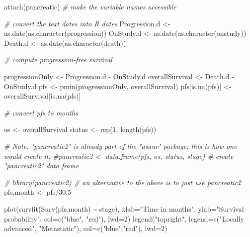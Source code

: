 \documentclass[
]{book}
\newenvironment{Shaded}{\begin{snugshade}}{\end{snugshade}}
\newcommand{\AttributeTok}[1]{\textcolor[rgb]{0.77,0.63,0.00}{#1}}
\newcommand{\CommentTok}[1]{\textcolor[rgb]{0.56,0.35,0.01}{\textit{#1}}}
\newcommand{\DecValTok}[1]{\textcolor[rgb]{0.00,0.00,0.81}{#1}}
\newcommand{\FloatTok}[1]{\textcolor[rgb]{0.00,0.00,0.81}{#1}}
\newcommand{\FunctionTok}[1]{\textcolor[rgb]{0.00,0.00,0.00}{#1}}
\newcommand{\NormalTok}[1]{#1}
\newcommand{\OtherTok}[1]{\textcolor[rgb]{0.56,0.35,0.01}{#1}}
\newcommand{\SpecialCharTok}[1]{\textcolor[rgb]{0.00,0.00,0.00}{#1}}
\newcommand{\StringTok}[1]{\textcolor[rgb]{0.31,0.60,0.02}{#1}}
\theoremstyle{definition}
\theoremstyle{definition}
\theoremstyle{definition}
\theoremstyle{definition}
\theoremstyle{remark}
\begin{document}
\begin{Shaded}
\begin{Highlighting}[]
\FunctionTok{attach}\NormalTok{(pancreatic)     }\CommentTok{\# make the variable names accessible}

\CommentTok{\# convert the text dates into R dates}
\NormalTok{Progression.d }\OtherTok{\textless{}{-}} \FunctionTok{as.date}\NormalTok{(}\FunctionTok{as.character}\NormalTok{(progression))}
\NormalTok{OnStudy.d }\OtherTok{\textless{}{-}} \FunctionTok{as.date}\NormalTok{(}\FunctionTok{as.character}\NormalTok{(onstudy))}
\NormalTok{Death.d }\OtherTok{\textless{}{-}} \FunctionTok{as.date}\NormalTok{(}\FunctionTok{as.character}\NormalTok{(death))}

\CommentTok{\# compute progression{-}free survival}

\NormalTok{progressionOnly }\OtherTok{\textless{}{-}}\NormalTok{ Progression.d }\SpecialCharTok{{-}}\NormalTok{ OnStudy.d}
\NormalTok{overallSurvival }\OtherTok{\textless{}{-}}\NormalTok{ Death.d }\SpecialCharTok{{-}}\NormalTok{ OnStudy.d}
\NormalTok{pfs }\OtherTok{\textless{}{-}} \FunctionTok{pmin}\NormalTok{(progressionOnly, overallSurvival)}
\NormalTok{pfs[}\FunctionTok{is.na}\NormalTok{(pfs)] }\OtherTok{\textless{}{-}}\NormalTok{ overallSurvival[}\FunctionTok{is.na}\NormalTok{(pfs)]}

\CommentTok{\# convert pfs to months}

\NormalTok{os }\OtherTok{\textless{}{-}}\NormalTok{ overallSurvival}
\NormalTok{status }\OtherTok{\textless{}{-}} \FunctionTok{rep}\NormalTok{(}\DecValTok{1}\NormalTok{, }\FunctionTok{length}\NormalTok{(pfs))}

\CommentTok{\# Note:  "pancreatic2" is already part of the "asaur" package; this is how one would create it:}
\CommentTok{\#pancreatic2 \textless{}{-} data.frame(pfs, os, status, stage)    \# create "pancreatic2" data frame}

\CommentTok{\# library(pancreatic2) \# an alternative to the above is to just use pancreatic2}
\NormalTok{pfs.month }\OtherTok{\textless{}{-}}\NormalTok{ pfs}\SpecialCharTok{/}\FloatTok{30.5}

\FunctionTok{plot}\NormalTok{(}\FunctionTok{survfit}\NormalTok{(}\FunctionTok{Surv}\NormalTok{(pfs.month) }\SpecialCharTok{\textasciitilde{}}\NormalTok{ stage), }\AttributeTok{xlab=}\StringTok{"Time in months"}\NormalTok{,}
   \AttributeTok{ylab=}\StringTok{"Survival probability"}\NormalTok{, }\AttributeTok{col=}\FunctionTok{c}\NormalTok{(}\StringTok{"blue"}\NormalTok{, }\StringTok{"red"}\NormalTok{), }\AttributeTok{lwd=}\DecValTok{2}\NormalTok{)}
\FunctionTok{legend}\NormalTok{(}\StringTok{"topright"}\NormalTok{, }\AttributeTok{legend=}\FunctionTok{c}\NormalTok{(}\StringTok{"Locally advanced"}\NormalTok{, }\StringTok{"Metastatic"}\NormalTok{),}
  \AttributeTok{col=}\FunctionTok{c}\NormalTok{(}\StringTok{"blue"}\NormalTok{,}\StringTok{"red"}\NormalTok{), }\AttributeTok{lwd=}\DecValTok{2}\NormalTok{)}
\end{Highlighting}
\end{Shaded}
\end{document}
